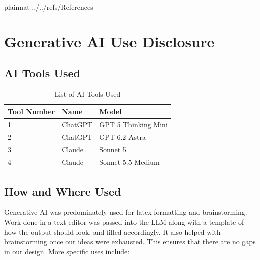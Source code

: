 \documentclass[12pt, titlepage]{article}
\begin{document}
\clearpage

\renewcommand{\bibsection}{%
  \section*{\refname}%
  \addcontentsline{toc}{section}{\refname}%
}
 {plainnat}
 {../../refs/References}

\clearpage

\appendix

\section{Generative AI Use Disclosure}

\subsection{AI Tools Used}

\begin{table}[hp]
\caption{List of AI Tools Used} \label{aiToolsUsed}
\begin{tabularx}{\textwidth}{llX}
\toprule
\textbf{Tool Number} & \textbf{Name} & \textbf{Model} \\
\midrule
1 & ChatGPT & GPT 5 Thinking Mini \\
2 & ChatGPT & GPT 6.2 Astra \\
3 & Claude & Sonnet 5 \\
4 & Claude & Sonnet 5.5 Medium \\

\bottomrule
\end{tabularx}
\end{table}

\subsection{How and Where Used}

Generative AI was predominately used for latex formatting and brainstorming. Work done in a text editor was passed into the LLM along with a template of how the output should look, and filled accordingly. It also helped with brainstorming once our ideas were exhausted. This ensures that there are no gaps in our design. More specific uses include:  
\end{document}

